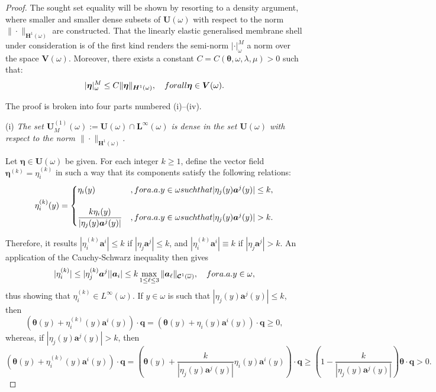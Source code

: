 \documentclass{amsart}
\begin{document}
\begin{proof}
	The sought set equality will be shown by resorting to a density argument, where smaller and smaller dense subsets of $\bm{U}(\omega)$ with respect to the norm $\|\cdot\|_{\bm{H}^1(\omega)}$ are constructed. That the linearly elastic generalised membrane shell under consideration is of the first kind renders the semi-norm $|\cdot|_\omega^M$ a norm over the space $\bm{V}(\omega)$. Moreover, there exists a constant $C=C(\bm{\theta},\omega,\lambda,\mu)>0$ such that:
	\begin{equation}
		\label{norms}
		|\bm{\eta}|_\omega^M \le C \|\bm{\eta}\|_{\bm{H}^1(\omega)},\quad\textup{ for all }\bm{\eta} \in \bm{V}(\omega).
	\end{equation}
	
	The proof is broken into four parts numbered (i)--(iv).
	
	(i) \emph{The set $\bm{U}_M^{(1)}(\omega):=\bm{U}(\omega) \cap \bm{L}^\infty(\omega)$ is dense in the set $\bm{U}(\omega)$ with respect to the norm $\|\cdot\|_{\bm{H}^1(\omega)}$.}
	
	Let $\bm{\eta}\in\bm{U}(\omega)$ be given. For each integer $k\ge 1$, define the vector field $\bm{\eta}^{(k)}=\eta_i^{(k)}$ in such a way that its components satisfy the following relations:
	\begin{equation*}
		\eta_i^{(k)}(y)=
		\begin{cases}
			\eta_i(y)&, \textup{ for a.a. }y\in\omega \textup{ such that }|\eta_j(y)\bm{a}^j(y)|\le k,\\
			\\
			\dfrac{k\eta_i(y)}{|\eta_j(y)\bm{a}^j(y)|}&, \textup{ for a.a. }y\in\omega \textup{ such that }|\eta_j(y)\bm{a}^j(y)|> k.
		\end{cases}
	\end{equation*}
	
	Therefore, it results $|\eta_i^{(k)}\bm{a}^i|\le k$ if $|\eta_j\bm{a}^j|\le k$, and $|\eta_i^{(k)}\bm{a}^i|\equiv k$ if $|\eta_j\bm{a}^j|> k$.
	An application of the Cauchy-Schwarz inequality then gives
	\begin{equation*}
		|\eta_i^{(k)}|\le |\eta_j^{(k)}\bm{a}^j| |\bm{a}_i| \le k \max_{1\le \ell \le 3}\|\bm{a}_\ell\|_{\bm{\mathcal{C}}^1(\overline{\omega})},\quad\textup{ for a.a. }y\in\omega,
	\end{equation*}
	thus showing that $\eta_i^{(k)} \in L^\infty(\omega)$. If $y\in\omega$ is such that $|\eta_j(y)\bm{a}^j(y)|\le k$, then
	\begin{equation*}
		(\bm{\theta}(y)+\eta_i^{(k)}(y)\bm{a}^i(y))\cdot\bm{q}=(\bm{\theta}(y)+\eta_i(y)\bm{a}^i(y))\cdot\bm{q} \ge 0,
	\end{equation*}
	whereas, if $|\eta_j(y)\bm{a}^j(y)|>k$, then
	\begin{equation*}
		(\bm{\theta}(y)+\eta_i^{(k)}(y)\bm{a}^i(y))\cdot\bm{q}=\left(\bm{\theta}(y)+\dfrac{k}{|\eta_j(y)\bm{a}^j(y)|}\eta_i(y)\bm{a}^i(y)\right)\cdot\bm{q} \ge \left(1-\dfrac{k}{|\eta_j(y)\bm{a}^j(y)|}\right)\bm{\theta}\cdot\bm{q}> 0.
	\end{equation*}
	

\end{proof}
\end{document}
